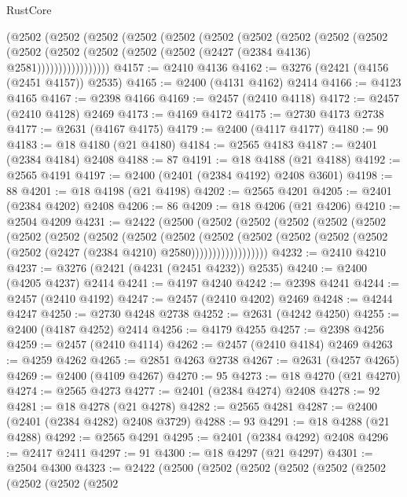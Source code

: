 \begin{lexlean}{RustCore}
\begin{coremodule}
      (@2502
        (@2502
          (@2502
            (@2502
              (@2502
                (@2502
                  (@2502
                    (@2502
                      (@2502
                        (@2502
                          (@2502
                            (@2502 (@2502 (@2502 (@2502 (@2427 (@2384 @4136) @2581)))))))))))))))))
@4157 := @2410 @4136
@4162 := @3276 (@2421 (@4156 (@2451 @4157)) @2535)
@4165 := @2400 (@4131 @4162) @2414
@4166 := @4123 @4165
@4167 := @2398 @4166
@4169 := @2457 (@2410 @4118)
@4172 := @2457 (@2410 @4128) @2469
@4173 := @4169 @4172
@4175 := @2730 @4173 @2738
@4177 := @2631 (@4167 @4175)
@4179 := @2400 (@4117 @4177)
@4180 := 90
@4183 := @18 @4180 (@21 @4180)
@4184 := @2565 @4183
@4187 := @2401 (@2384 @4184) @2408
@4188 := 87
@4191 := @18 @4188 (@21 @4188)
@4192 := @2565 @4191
@4197 := @2400 (@2401 (@2384 @4192) @2408 @3601)
@4198 := 88
@4201 := @18 @4198 (@21 @4198)
@4202 := @2565 @4201
@4205 := @2401 (@2384 @4202) @2408
@4206 := 86
@4209 := @18 @4206 (@21 @4206)
@4210 := @2504 @4209
@4231 := @2422
    (@2500
      (@2502
        (@2502
          (@2502
            (@2502
              (@2502
                (@2502
                  (@2502
                    (@2502
                      (@2502
                        (@2502
                          (@2502
                            (@2502
                              (@2502
                                (@2502 (@2502 (@2502 (@2427 (@2384 @4210) @2580))))))))))))))))))
@4232 := @2410 @4210
@4237 := @3276 (@2421 (@4231 (@2451 @4232)) @2535)
@4240 := @2400 (@4205 @4237) @2414
@4241 := @4197 @4240
@4242 := @2398 @4241
@4244 := @2457 (@2410 @4192)
@4247 := @2457 (@2410 @4202) @2469
@4248 := @4244 @4247
@4250 := @2730 @4248 @2738
@4252 := @2631 (@4242 @4250)
@4255 := @2400 (@4187 @4252) @2414
@4256 := @4179 @4255
@4257 := @2398 @4256
@4259 := @2457 (@2410 @4114)
@4262 := @2457 (@2410 @4184) @2469
@4263 := @4259 @4262
@4265 := @2851 @4263 @2738
@4267 := @2631 (@4257 @4265)
@4269 := @2400 (@4109 @4267)
@4270 := 95
@4273 := @18 @4270 (@21 @4270)
@4274 := @2565 @4273
@4277 := @2401 (@2384 @4274) @2408
@4278 := 92
@4281 := @18 @4278 (@21 @4278)
@4282 := @2565 @4281
@4287 := @2400 (@2401 (@2384 @4282) @2408 @3729)
@4288 := 93
@4291 := @18 @4288 (@21 @4288)
@4292 := @2565 @4291
@4295 := @2401 (@2384 @4292) @2408
@4296 := @2417 @2411
@4297 := 91
@4300 := @18 @4297 (@21 @4297)
@4301 := @2504 @4300
@4323 := @2422
    (@2500
      (@2502
        (@2502
          (@2502
            (@2502
              (@2502
                (@2502
                  (@2502
                    (@2502

\end{coremodule}
\end{lexlean}
